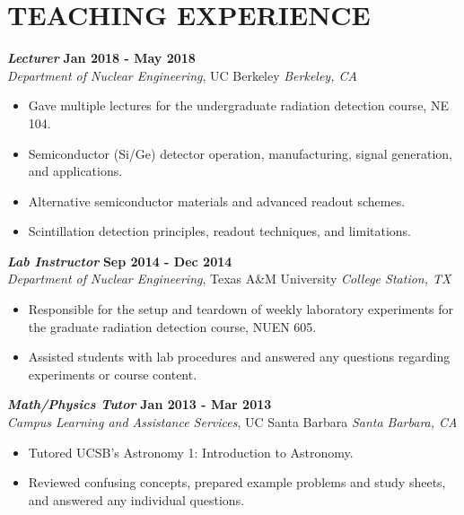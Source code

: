 \section{\small{TEACHING EXPERIENCE}}

{\sl\bf Lecturer} \hfill {\bf Jan 2018 - May 2018} \\
{\sl Department of Nuclear Engineering}, UC Berkeley \hfill {\sl Berkeley, CA}\\[-2.8ex]
\vspace{2pt}
\begin{itemize}[leftmargin=4ex] \itemsep -2pt
\item Gave multiple lectures for the undergraduate radiation detection course, NE 104.
\item Semiconductor (Si/Ge) detector operation, manufacturing, signal generation, and applications.
\item Alternative semiconductor materials and advanced readout schemes.
\item Scintillation detection principles, readout techniques, and limitations.
\end{itemize} 

{\sl\bf Lab Instructor} \hfill {\bf Sep 2014 - Dec 2014} \\
{\sl Department of Nuclear Engineering}, Texas A\&M University \hfill {\sl College Station, TX}\\[-2.8ex]
\vspace{2pt}
\begin{itemize}[leftmargin=4ex] \itemsep -2pt
\item Responsible for the setup and teardown of weekly laboratory experiments for the graduate radiation detection course, NUEN 605.
\item Assisted students with lab procedures and answered any questions regarding experiments or course content.
\end{itemize} 

{\sl\bf Math/Physics Tutor} \hfill {\bf Jan 2013 - Mar 2013} \\
{\sl Campus Learning and Assistance Services}, UC Santa Barbara \hfill {\sl Santa Barbara, CA} \\[-2.8ex]
\vspace{2pt}
\begin{itemize}[leftmargin=4ex] \itemsep -2pt
\item Tutored UCSB's Astronomy 1: Introduction to Astronomy. 		
\item Reviewed confusing concepts, prepared example problems and study sheets, and answered any individual questions.
\end{itemize} 